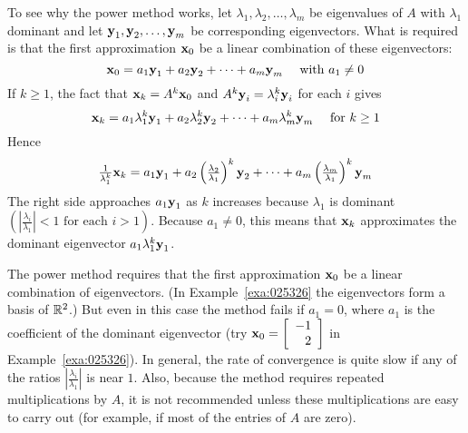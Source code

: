 To see why the power method works, let $\lambda_{1}, \lambda_{2}, \dots, \lambda_{m}$ be eigenvalues of $A$ with $\lambda_{1}$ dominant and let $\textbf{y}_{1}, \textbf{y}_{2}, \dots, \textbf{y}_{m}$ be corresponding eigenvectors. What is required is that the first approximation $\textbf{x}_{0}$ be a linear combination of these eigenvectors:
\begin{equation*}
\textbf{x}_{0} = a_{1}\textbf{y}_{1} + a_{2}\textbf{y}_{2} + \dots + a_{m}\textbf{y}_{m} \quad \mbox{ with } a_{1} \neq 0
\end{equation*}
If $k \geq 1$, the fact that $\textbf{x}_{k} = A^{k}\textbf{x}_{0}$ and $A^k\textbf{y}_{i} = \lambda_{i}^k\textbf{y}_{i}$ for each $i$ gives
\begin{equation*}
\textbf{x}_{k} = a_{1}\lambda_{1}^k\textbf{y}_{1} + a_{2}\lambda_{2}^k\textbf{y}_{2} + \dots + a_{m}\lambda_{m}^k\textbf{y}_{m} \quad \mbox{ for } k \geq 1
\end{equation*}
Hence
\begin{equation*}
\tfrac{1}{\lambda_{1}^k}\textbf{x}_{k} = a_{1}\textbf{y}_{1} + a_{2}\left(\tfrac{\lambda_{2}}{\lambda_{1}}\right)^k\textbf{y}_{2} + \dots + a_{m}\left(\tfrac{\lambda_{m}}{\lambda_{1}}\right)^k\textbf{y}_{m}
\end{equation*}
The right side approaches $a_{1}\textbf{y}_{1}$ as $k$ increases because $\lambda_{1}$ is dominant $\left( \left|\frac{\lambda_{i}}{\lambda_{1}} \right| < 1 \mbox{ for each } i > 1 \right)$. Because $a_{1} \neq 0$, this means that $\textbf{x}_{k}$ approximates the dominant eigenvector $a_{1}\lambda_{1}^k\textbf{y}_{1}$.


The power method requires that the first approximation $\textbf{x}_{0}$ be a linear combination of eigenvectors. (In Example~\ref{exa:025326} the eigenvectors form a basis of $\mathbb{R}^2$.) But even in this case the method fails if $a_{1} = 0$, where $a_{1}$ is the coefficient of the dominant eigenvector (try $\textbf{x}_{0} = \left[ \begin{array}{rr}
-1 \\
2 
\end{array}\right]$ in Example~\ref{exa:025326}). In general, the rate of convergence is quite slow if any of the ratios $\left| \frac{\lambda_{i}}{\lambda_{1}} \right|$ is near $1$. Also, because the method requires repeated multiplications by $A$, it is not recommended unless these multiplications are easy to carry out (for example, if most of the entries of $A$ are zero).


